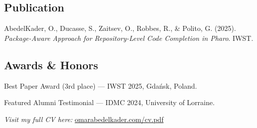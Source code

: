 \subsection{{Publication}}
\begin{zitemize}
    \item AbedelKader, O., Ducasse, S., Zaitsev, O., Robbes, R., \& Polito, G. (2025). \textit{Package-Aware Approach for Repository-Level Code Completion in Pharo}. IWST.
\end{zitemize}

\subsection{{Awards \& Honors}}
\begin{zitemize}
    \item Best Paper Award (3rd place) --- IWST 2025, Gdańsk, Poland.
    \item Featured Alumni Testimonial --- IDMC 2024, University of Lorraine.
\end{zitemize}

\vspace{2mm}
\noindent\textit{Visit my full CV here:} \href{https://omarabedelkader.com/cv/cv.pdf}{omarabedelkader.com/cv.pdf}
